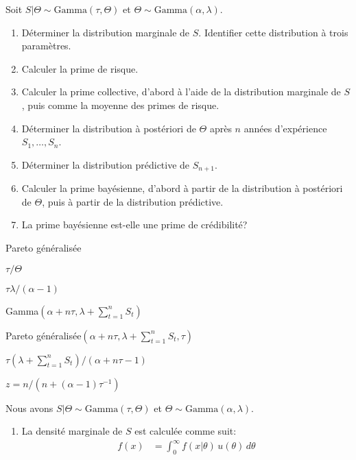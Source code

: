 \begin{exercice}
  \label{exercice:bayesienne:gamma-gamma}
  Soit $S|\Theta \sim \text{Gamma}(\tau, \Theta)$ et $\Theta \sim
  \text{Gamma}(\alpha, \lambda)$.
  \begin{enumerate}
  \item Déterminer la distribution marginale de $S$. Identifier cette
    distribution à trois paramètres.
  \item Calculer la prime de risque.
  \item Calculer la prime collective, d'abord à l'aide de la
    distribution marginale de $S$, puis comme la moyenne des primes de
    risque.
  \item Déterminer la distribution à postériori de $\Theta$ après $n$
    années d'expérience $S_1, \dots, S_n$.
  \item Déterminer la distribution prédictive de $S_{n+1}$.
  \item Calculer la prime bayésienne, d'abord à partir de la
    distribution à postériori de $\Theta$, puis à partir de la
    distribution prédictive.
  \item La prime bayésienne est-elle une prime de crédibilité?
  \end{enumerate}
  \begin{rep}
    \begin{inparaenum}
    \item Pareto généralisée
    \item $\tau/\Theta$
    \item $\tau \lambda/(\alpha - 1)$
    \item Gamma$(\alpha + n\tau, \lambda + \sum_{t=1}^n S_t)$
    \item Pareto généralisée$(\alpha + n\tau, \lambda + \sum_{t=1}^n
      S_t, \tau)$
    \item $\tau (\lambda + \sum_{t=1}^n S_t)/(\alpha + n\tau - 1)$
    \item $z = n/(n + (\alpha - 1)\tau^{-1})$
    \end{inparaenum}
  \end{rep}
  \begin{sol}
    Nous avons $S|\Theta \sim \text{Gamma}(\tau, \Theta)$ et $\Theta
    \sim \text{Gamma}(\alpha, \lambda)$.
    \begin{enumerate}
    \item La densité marginale de $S$ est calculée comme suit:
      \begin{align*}
        f(x)
        &= \int_0^\infty f(x|\theta)\, u(\theta)\, d\theta \\

\end{align*}
\end{enumerate}
\end{sol}
\end{exercice}
